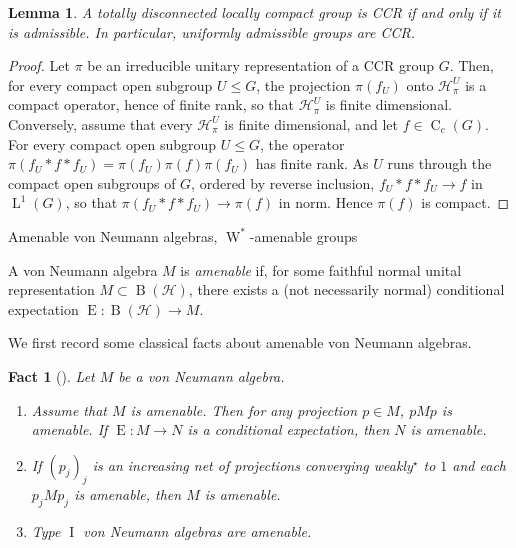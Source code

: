 \documentclass[11pt]{amsart}
\makeatletter
\numberwithin{equation}{section}
\def\subsection{\@startsection{subsection}{2}%
  \z@{.7\linespacing\@plus.7\linespacing}{.3\linespacing}%
  {\normalfont\bfseries}}
\renewcommand{\H}{\mathcal H}
\DeclareMathOperator{\I}{I}
\newcommand{\Wstar}{\operatorname{W}^*}
\newcommand{\rB}{\operatorname{B}}
\newcommand{\rC}{\operatorname{C}}
\newcommand{\rL}{\operatorname{L}}
\newcommand{\rE}{\operatorname{E}}
\newtheorem{Lem}[The]{Lemma}
\newtheorem{fact}[The]{Fact}
\theoremstyle{definition}
\makeatother
\begin{document}
\begin{Lem}
    \label{lem:ccr-admissible}
    A totally disconnected locally compact group is \textup{CCR} if and only if it is admissible. In particular, uniformly admissible groups are \textup{CCR}.
\end{Lem}

\begin{proof}
    Let $\pi$ be an irreducible unitary representation of a \textup{CCR} group $G$. Then, for every compact open subgroup $U\leq G$, the projection $\pi(f_U)$ onto $\H_\pi^U$ is a compact operator, hence of finite rank, so that $\H_\pi^U$ is finite dimensional. Conversely, assume that every $\H_\pi^U$ is finite dimensional, and let $f\in\rC_c(G)$. For every compact open subgroup $U\leq G$, the operator $\pi(f_U\ast f\ast f_U)=\pi(f_U)\pi(f)\pi(f_U)$ has finite rank. As $U$ runs through the compact open subgroups of $G$, ordered by reverse inclusion, $f_U\ast f\ast f_U\to f$ in $\rL^1(G)$, so that $\pi(f_U\ast f\ast f_U)\to\pi(f)$ in norm. Hence $\pi(f)$ is compact.
\end{proof}


\subsection{Amenable von Neumann algebras, $\Wstar$-amenable groups}
\label{subsec:prelim-amenable}

A von Neumann algebra $M$ is \emph{amenable} if, for some faithful normal unital representation $M\subset\rB(\H)$, there exists a (not necessarily normal) conditional expectation $\rE:\rB(\H)\to M$. 

We first record some classical facts about amenable von Neumann algebras. 

\begin{fact}[{\cite[Sections~III.3 and IV.2]{Bl06}}]
    \label{fact:amenability-properties}
    Let $M$ be a von Neumann algebra.
    \begin{enumerate}[\rm (i)]
        \item\label{it:amenability-expected-corners} Assume that $M$ is amenable. Then for any projection $p\in M$, $pMp$ is amenable. If $\rE:M\to N$ is a conditional expectation, then $N$ is amenable. 
        \item\label{it:amenability-increasing-corners} 
        If $(p_j)_j$ is an increasing net of projections converging weakly$^\star$ to $1$ and each $p_jMp_j$ is amenable, then $M$ is amenable.
        \item\label{it:amenability-type-i} Type $\I$ von Neumann algebras are amenable.
    \end{enumerate}
\end{fact}
\end{document}
